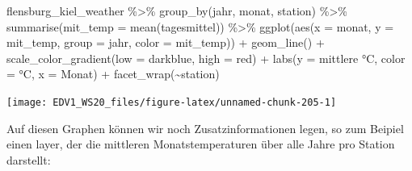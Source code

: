 \documentclass[
]{book}
\newenvironment{Shaded}{\begin{snugshade}}{\end{snugshade}}
\newcommand{\AttributeTok}[1]{\textcolor[rgb]{0.77,0.63,0.00}{#1}}
\newcommand{\FunctionTok}[1]{\textcolor[rgb]{0.00,0.00,0.00}{#1}}
\newcommand{\NormalTok}[1]{#1}
\newcommand{\SpecialCharTok}[1]{\textcolor[rgb]{0.00,0.00,0.00}{#1}}
\newcommand{\StringTok}[1]{\textcolor[rgb]{0.31,0.60,0.02}{#1}}
\begin{document}
\begin{Shaded}
\begin{Highlighting}[]
\NormalTok{flensburg\_kiel\_weather }\SpecialCharTok{\%\textgreater{}\%} 
  \FunctionTok{group\_by}\NormalTok{(jahr, monat, station) }\SpecialCharTok{\%\textgreater{}\%} 
  \FunctionTok{summarise}\NormalTok{(}\AttributeTok{mit\_temp =} \FunctionTok{mean}\NormalTok{(tagesmittel)) }\SpecialCharTok{\%\textgreater{}\%} 
  \FunctionTok{ggplot}\NormalTok{(}\FunctionTok{aes}\NormalTok{(}\AttributeTok{x =}\NormalTok{ monat, }
             \AttributeTok{y =}\NormalTok{ mit\_temp,}
             \AttributeTok{group =}\NormalTok{ jahr,}
             \AttributeTok{color =}\NormalTok{ mit\_temp)) }\SpecialCharTok{+}
  \FunctionTok{geom\_line}\NormalTok{() }\SpecialCharTok{+}
  \FunctionTok{scale\_color\_gradient}\NormalTok{(}\AttributeTok{low =} \StringTok{\textquotesingle{}darkblue\textquotesingle{}}\NormalTok{,}
                       \AttributeTok{high =} \StringTok{\textquotesingle{}red\textquotesingle{}}\NormalTok{) }\SpecialCharTok{+}
  \FunctionTok{labs}\NormalTok{(}\AttributeTok{y =} \StringTok{\textquotesingle{}mittlere °C\textquotesingle{}}\NormalTok{,}
       \AttributeTok{color =} \StringTok{\textquotesingle{}°C\textquotesingle{}}\NormalTok{,}
       \AttributeTok{x =} \StringTok{\textquotesingle{}Monat\textquotesingle{}}\NormalTok{) }\SpecialCharTok{+}
  \FunctionTok{facet\_wrap}\NormalTok{(}\SpecialCharTok{\textasciitilde{}}\NormalTok{station)}
\end{Highlighting}
\end{Shaded}

\begin{center}\texttt{[image: EDV1\_WS20\_files/figure-latex/unnamed-chunk-205-1]} \end{center}

Auf diesen Graphen können wir noch Zusatzinformationen legen, so zum Beipiel einen layer, der die mittleren Monatstemperaturen über alle Jahre pro Station darstellt:
\end{document}
